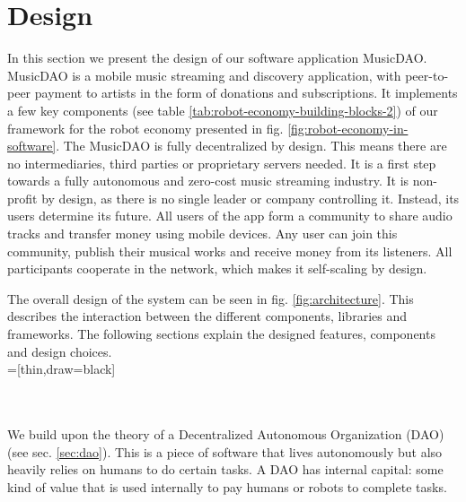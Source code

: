 \chapter{Design}
\label{chap:design}
In this section we present the design of our software application MusicDAO. MusicDAO is a mobile music streaming and discovery application, with peer-to-peer payment to artists in the form of donations and subscriptions. It implements a few key components (see table \ref{tab:robot-economy-building-blocks-2}) of our framework for the robot economy presented in fig. \ref{fig:robot-economy-in-software}. The MusicDAO is fully decentralized by design. This means there are no intermediaries, third parties or proprietary servers needed. It is a first step towards a fully autonomous and zero-cost music streaming industry. It is non-profit by design, as there is no single leader or company controlling it. Instead, its users determine its future. All users of the app form a community to share audio tracks and transfer money using mobile devices. Any user can join this community, publish their musical works and receive money from its listeners. All participants cooperate in the network, which makes it self-scaling by design.

The overall design of the system can be seen in fig. \ref{fig:architecture}. This describes the interaction between the different components, libraries and frameworks. The following sections explain the designed features, components and design choices.
\\

=[thin,draw=black]
\\
\\
We build upon the theory of a Decentralized Autonomous Organization (DAO) (see sec. \ref{sec:dao}). This is a piece of software that lives autonomously but also heavily relies on humans to do certain tasks. A DAO has internal capital: some kind of value that is used internally to pay humans or robots to complete tasks.

